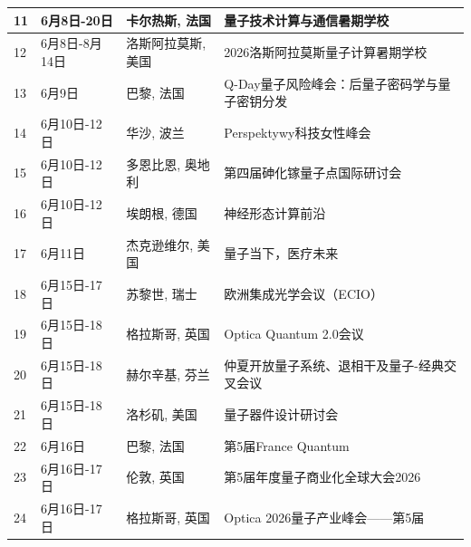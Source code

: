 \documentclass[12pt,a4paper]{ctexart}
\begin{document}
{\begin{longtable}{C{0.8cm}L{2.5cm}L{3cm}L{7cm}}
        11 & 6月8日-20日 & 卡尔热斯, 法国 & 量子技术计算与通信暑期学校 \\
        \midrule[0.05pt]
        
        12 & 6月8日-8月14日 & 洛斯阿拉莫斯, 美国 & 2026洛斯阿拉莫斯量子计算暑期学校 \\
        \midrule[0.05pt]
        
        13 & 6月9日 & 巴黎, 法国 & Q-Day量子风险峰会：后量子密码学与量子密钥分发 \\
        \midrule[0.05pt]
        
        14 & 6月10日-12日 & 华沙, 波兰 & Perspektywy科技女性峰会 \\
        \midrule[0.05pt]
        
        15 & 6月10日-12日 & 多恩比恩, 奥地利 & 第四届砷化镓量子点国际研讨会 \\
        \midrule[0.05pt]
        
        16 & 6月10日-12日 & 埃朗根, 德国 & 神经形态计算前沿 \\
        \midrule[0.05pt]
        
        17 & 6月11日 & 杰克逊维尔, 美国 & 量子当下，医疗未来 \\
        \midrule[0.05pt]
        
        18 & 6月15日-17日 & 苏黎世, 瑞士 & 欧洲集成光学会议（ECIO） \\
        \midrule[0.05pt]
        
        19 & 6月15日-18日 & 格拉斯哥, 英国 & Optica Quantum 2.0会议 \\
        \midrule[0.05pt]
        
        20 & 6月15日-18日 & 赫尔辛基, 芬兰 & 仲夏开放量子系统、退相干及量子-经典交叉会议 \\
        \midrule[0.05pt]
        
        21 & 6月15日-18日 & 洛杉矶, 美国 & 量子器件设计研讨会 \\
        \midrule[0.05pt]
        
        22 & 6月16日 & 巴黎, 法国 & 第5届France Quantum \\
        \midrule[0.05pt]
        
        23 & 6月16日-17日 & 伦敦, 英国 & 第5届年度量子商业化全球大会2026 \\
        \midrule[0.05pt]
        
        24 & 6月16日-17日 & 格拉斯哥, 英国 & Optica 2026量子产业峰会——第5届 \\
        \midrule[0.05pt]
        

\end{longtable}}
\end{document}
